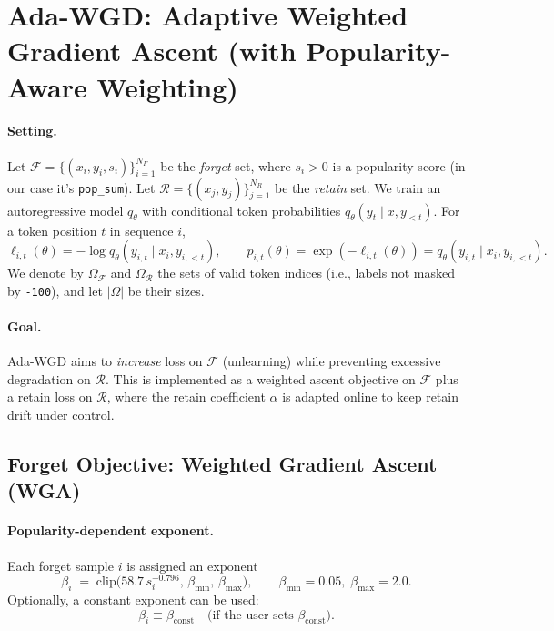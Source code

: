 \section{Ada-WGD: Adaptive Weighted Gradient Ascent (with Popularity-Aware Weighting)}

  \paragraph{Setting.}
  Let $\mathcal{F}=\{(x_i,y_i,s_i)\}_{i=1}^{N_F}$ be the \emph{forget} set, where $s_i>0$
  is a popularity score (in our case it's \texttt{pop\_sum}).
  Let $\mathcal{R}=\{(x_j,y_j)\}_{j=1}^{N_R}$ be the \emph{retain} set.
  We train an autoregressive model $q_\theta$ with conditional token probabilities
  $q_\theta(y_t\mid x,y_{<t})$.
  For a token position $t$ in sequence $i$,
  \[
  \ell_{i,t}(\theta) = -\log q_\theta(y_{i,t}\mid x_i,y_{i,<t}),
  \qquad
  p_{i,t}(\theta) = \exp(-\ell_{i,t}(\theta)) = q_\theta(y_{i,t}\mid x_i,y_{i,<t}).
  \]
  We denote by $\Omega_{\mathcal{F}}$ and $\Omega_{\mathcal{R}}$ the sets of valid
  token indices (i.e., labels not masked by \texttt{-100}), and let $|\Omega|$ be their sizes.

  \paragraph{Goal.}
  Ada-WGD aims to \emph{increase} loss on $\mathcal{F}$ (unlearning) while preventing
  excessive degradation on $\mathcal{R}$.
  This is implemented as a weighted ascent objective on $\mathcal{F}$ plus a retain loss on $\mathcal{R}$,
  where the retain coefficient $\alpha$ is adapted online to keep retain drift under control.

  \subsection{Forget Objective: Weighted Gradient Ascent (WGA)}

  \paragraph{Popularity-dependent exponent.}
  Each forget sample $i$ is assigned an exponent
  \[
  \beta_i \;=\; \mathrm{clip}\!\Big(58.7\,s_i^{-0.796},\,\beta_{\min},\,\beta_{\max}\Big),
  \qquad \beta_{\min}=0.05,\;\beta_{\max}=2.0.
  \]
  Optionally, a constant exponent can be used:
  \[
  \beta_i \equiv \beta_{\mathrm{const}} \quad \text{(if the user sets }\beta_{\mathrm{const}}\text{).}
  \]

